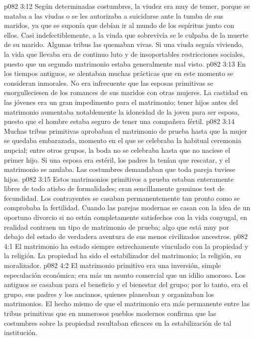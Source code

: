 \vs p082 3:12 \pc Según determinadas costumbres, la viudez era muy de temer, porque se mataba a las viudas o se les autorizaba a suicidarse ante la tumba de sus maridos, ya que se suponía que debían ir al mundo de los espíritus junto con ellos. Casi indefectiblemente, a la viuda que sobrevivía se le culpaba de la muerte de su marido. Algunas tribus las quemaban vivas. Si una viuda seguía viviendo, la vida que llevaba era de continuo luto y de insoportables restricciones sociales, puesto que un segundo matrimonio estaba generalmente mal visto.
\vs p082 3:13 En los tiempos antiguos, se alentaban muchas prácticas que en este momento se consideran inmorales. No era infrecuente que las esposas primitivas se enorgulleciesen de los romances de sus maridos con otras mujeres. La castidad en las jóvenes era un gran impedimento para el matrimonio; tener hijos antes del matrimonio aumentaba notablemente la idoneidad de la joven para ser esposa, puesto que el hombre estaba seguro de tener una compañera fértil.
\vs p082 3:14 Muchas tribus primitivas aprobaban el matrimonio de prueba hasta que la mujer se quedaba embarazada, momento en el que se celebraba la habitual ceremonia nupcial; entre otros grupos, la boda no se celebraba hasta que no naciese el primer hijo. Si una esposa era estéril, los padres la tenían que rescatar, y el matrimonio se anulaba. Las costumbres demandaban que toda pareja tuviese hijos.
\vs p082 3:15 Estos matrimonios primitivos a prueba estaban enteramente libres de todo atisbo de formalidades; eran sencillamente genuinos test de fecundidad. Los contrayentes se casaban permanentemente tan pronto como se comprobaba la fertilidad. Cuando las parejas modernas se casan con la idea de un oportuno divorcio si no están completamente satisfechos con la vida conyugal, en realidad contraen un tipo de matrimonio de prueba; algo que está muy por debajo del estado de verdadera aventura de sus menos civilizados ancestros.
\vs p082 4:1 El matrimonio ha estado siempre estrechamente vinculado con la propiedad y la religión. La propiedad ha sido el estabilizador del matrimonio; la religión, su moralizador.
\vs p082 4:2 El matrimonio primitivo era una inversión, simple especulación económica; era más un asunto comercial que un idilio amoroso. Los antiguos se casaban para el beneficio y el bienestar del grupo; por lo tanto, era el grupo, sus padres y los ancianos, quienes planeaban y organizaban los matrimonios. El hecho mismo de que el matrimonio era más permanente entre las tribus primitivas que en numerosos pueblos modernos confirma que las costumbres sobre la propiedad resultaban eficaces en la estabilización de tal institución.
